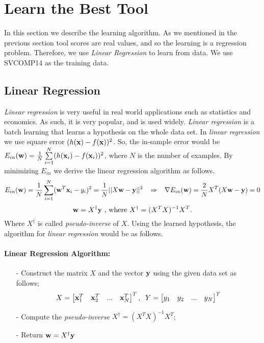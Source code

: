 \section{Learn the Best Tool}
\label{classification}
In this section we describe the learning algorithm. As we mentioned in the previous section tool scores are real values, and so the learning is a regression problem. Therefore, we use \emph{Linear Regression} to learn from data. We use SVCOMP14 as the training data.

\subsection{Linear Regression}
\emph{Linear regression} is very useful in real world applications such as statistics and economics. As such, it is very popular, and is used widely. \emph{Linear regression} is a batch learning that learns a hypothesis on the whole data set. In \emph{linear regression} we use square error $(h({\bf x}) - f({\bf x}))^2$. So, the in-sample error would be $E_{in}({\bf w}) = \frac{1}{N} \sum \limits_{i=1}^{N} (h({\bf x}_i) - f({\bf x}_i))^2 $, where $N$ is the number of examples. By minimizing $E_{in}$ we derive the linear regression algorithm as follows.
\[
E_{in}({\bf w}) = \frac{1}{N} \sum \limits_{i=1}^{N} ({\bf w}^T {\bf x}_i - y_i)^2 = \frac{1}{N} ||X {\bf w} - {\bf y}||^2 \;\;\; \Rightarrow \;\;\; \nabla E_{in}({\bf w}) = \frac{2}{N}X^T(X {\bf w} - {\bf y}) = 0
\]
\[
{\bf w} = X^{\dagger} {\bf y} \text{ , where } X^{\dagger} = (X^T X)^{-1} X^T.
\]
Where $ X^{\dagger}$ is called \emph{pseudo-inverse} of $X$. Using the learned hypothesis, the algorithm for \emph{linear regression} would be as follows.

\paragraph{\textbf{Linear Regression Algorithm:}}
\begin{itemize}
	\item[-] Construct the matrix $X$ and the vector ${\bf y}$ using the given data set as follows;
	\[
	X = \begin{bmatrix}
					{\bf x}^T_1 & {\bf x}^T_2 &	... & 	{\bf x}^T_N
		  \end{bmatrix}^T , \;\;
	Y = \begin{bmatrix}
					y_1 & y_2 &	... & 	y_N
		  \end{bmatrix}^T
	\]
	\item[-] Compute the \emph{pseudo-inverse} $X^{\dagger} = (X^T X)^{-1} X^T$;
	\item[-] Return ${\bf w} = X^{\dagger}{\bf y}$
\end{itemize}

